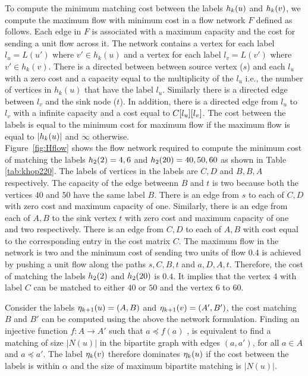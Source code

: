  To compute the minimum matching
cost between the \khop labels $h_{k}(u)$ and $h_{k}(v)$, we compute the
maximum flow with minimum cost in a flow network $F$ defined as follows.  Each
edge in $F$ is associated with a maximum capacity and the cost for sending a
unit flow across it.  The network contains a vertex for each label $l_u =
L(u')$ where $v' \in h_k(u)$ and a vertex for each label $l_v = L(v')$ where $v'
\in h_k(v)$. There is a directed between between source vertex ($s$) and each
$l_u$ with a zero cost and a capacity equal to the multiplicity of the $l_u$
i.e., the number of vertices in $h_k(u)$ that have the label $l_u$. Similarly
there is a directed edge between $l_v$ and the sink node ($t$). In addition,
there is a directed edge from $l_u$ to $l_v$ with a infinite capacity and a cost
equal to ${C}[l_u][l_v]$. The cost between the \khop labels is equal to
the minimum cost for maximum flow if the maximum flow is equal to
$|h_{k}(u)|$ and $\infty$ otherwise.  \\ Figure~\ref{fig:Hflow} shows the
flow network required to compute the minimum cost of matching the \khop labels
$h_{2}(2) = 4,6 $ and $h_{2}(20) = 40, 50, 60$ as shown in Table
\ref{tab:khop220}. The labels of vertices in the \khop labels are $C,D$ and $B,
B, A$ respectively. The capacity of the edge betweenn $B$ and $t$ is two because 
both the vertices $40$ and $50$ have the same label $B$.
There is an edge from $s$ to each of $C, D$ with zero cost
and maximum capacity of one.  Similarly, there is an edge from each of $A, B$ to
the sink vertex $t$ with zero cost and maximum capacity of one and two
respectively. There is an edge from $C, D$ to each of $A, B$ with cost equal to
the corresponding entry in the cost matrix $C$. The maximum flow in the network
is two and the minimum cost of sending two units of flow $0.4$ is achieved by
pushing a unit flow along the paths $s, C, B, t$ and $a, D, A, t$.  Therefore,
the cost of matching the labels $h_{2}(2)$ and $h_{2}(20)$ is $0.4$. It
implies that the vertex $4$ with label $C$ can be matched to either $40$ or $50$
and the vertex $6$ to $60$.

 Consider the 
\ncl labels $\eta_{k+1}(u) = (A, B)$ and  $\eta_{k+1}(v) = (A', B')$, the cost matching
$B$ and $B'$ can be computed using the above the network formulation.
Finding an injective function $f\!\!:A \rightarrow A'$ such that $a \preceq
f(a)$ , is equivalent to find a matching of size $|N(u)|$ in the bipartite graph
with edges $(a, a')$, for all $a \in A$ and $a \preceq a'$.
The \ncl label $\eta_{k}(v)$ therefore dominates $\eta_{k}(u)$ if the
cost between the \khop labels is within $\alpha$ and the size of maximum
bipartite matching is $|N(u)|$.

